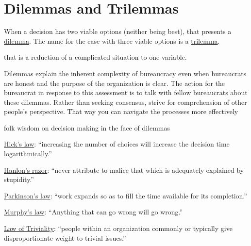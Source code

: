 \section{Dilemmas and Trilemmas\label{sec:dilemma_trilemma}}

When a decision has two viable options (neither being best), that presents a \href{https://en.wikipedia.org/wiki/Dilemma}{dilemma}. The name for the case with three viable options is a \href{https://en.wikipedia.org/wiki/Trilemma}{trilemma}. 

 that is a reduction of a complicated situation to one variable. 

Dilemmas explain the inherent complexity of bureaucracy even when bureaucrats are honest and the purpose of the organization is clear.
The action for the bureaucrat in response to this assessment is to talk with fellow bureaucrats about these dilemmas. Rather than seeking consensus, strive for comprehension of other people's perspective. That way you can navigate the processes more effectively

folk wisdom on decision making in the face of dilemmas

\href{https://en.wikipedia.org/wiki/Hick\%27s_law}{Hick's law}: ``increasing the number of choices will increase the decision time logarithmically.''

\href{https://en.wikipedia.org/wiki/Hanlon\%27s_razor}{Hanlon's razor}: ``never attribute to malice that which is adequately explained by stupidity.''

\href{https://en.wikipedia.org/wiki/Parkinson\%27s_law}{Parkinson's law}: ``work expands so as to fill the time available for its completion.''

\href{https://en.wikipedia.org/wiki/Murphy\%27s_law}{Murphy's law}: ``Anything that can go wrong will go wrong.''

\href{https://en.wikipedia.org/wiki/Law_of_triviality}{Law of Triviality}: ``people within an organization commonly or typically give disproportionate weight to trivial issues.''


